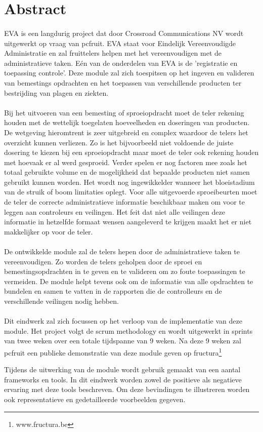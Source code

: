 \section* {Abstract}

\paragraph{}EVA is een langdurig project dat door Crossroad Communications NV wordt uitgewerkt op vraag van pcfruit. EVA staat voor Eindelijk Vereenvoudigde Administratie en zal fruittelers helpen met het vereenvoudigen met de administratieve taken. Eén van de onderdelen van EVA is de 'registratie en toepassing controle'. Deze module zal zich toespitsen op het ingeven en valideren van bemestings opdrachten en het toepassen van verschillende producten ter bestrijding van plagen en ziekten.
\paragraph{}Bij het uitvoeren van een bemesting of sproeiopdracht moet de teler rekening houden met de wettelijk toegelaten hoeveelheden en doseringen van producten. De wetgeving hieromtrent is zeer uitgebreid en complex waardoor de telers het overzicht kunnen verliezen. Zo is het bijvoorbeeld niet voldoende de juiste dosering te kiezen bij een sproeiopdracht maar moet de teler ook rekening houden met hoevaak er al werd gesproeid. Verder spelen er nog factoren mee zoals het totaal gebruikte volume en de mogelijkheid dat bepaalde producten niet samen gebruikt kunnen worden. Het wordt nog ingewikkelder wanneer het bloeistadium van de struik of boom limitaties oplegt. Voor alle uitgevoerde sproeibeurten moet de teler de correcte administratieve informatie beschikbaar maken om voor te leggen aan controleurs en veilingen. Het feit dat niet alle veilingen deze informatie in hetzelfde formaat wensen aangeleverd te krijgen maakt het er niet makkelijker op voor de teler.
\paragraph{}De ontwikkelde module zal de telers hepen door de administratieve taken te vereenvoudigen. Zo worden de telers geholpen door de sproei en bemestingsopdrachten in te geven en te valideren om zo foute toepassingen te vermeiden. De module helpt tevens ook om de informatie van alle opdrachten te bundelen en samen te vatten in de rapporten die de controlleurs en de verschillende veilingen nodig hebben.
\paragraph{}Dit eindwerk zal zich focussen op het verloop van de implementatie van deze module. Het project volgt de scrum methodology en wordt uitgewerkt in sprints van twee weken over een totale tijdspanne van 9 weken. Na deze 9 weken zal pcfruit een publieke demonstratie van deze module geven op fructura\footnote{www.fructura.be}

Tijdens de uitwerking van de module wordt gebruik gemaakt van een aantal frameworks en
tools. In dit eindwerk worden zowel de positieve als negatieve ervaring met deze tools
beschreven. Om deze bevindingen te illustreren worden ook representatieve en gedetailleerde
voorbeelden gegeven.
